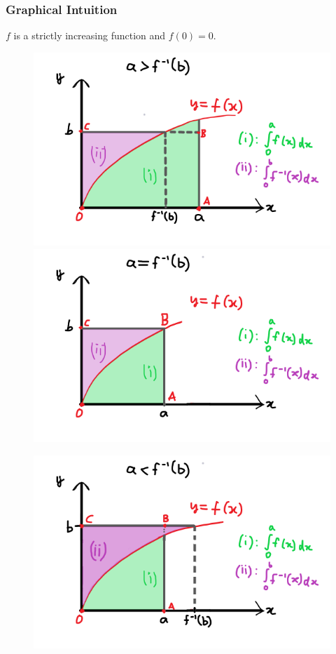 \documentclass[14]{article}
\theoremstyle{definition}
\theoremstyle{case}
\begin{document}
\subsubsection{Graphical Intuition}
$f$ is a strictly increasing function and $f(0) = 0$.
\begin{figure}[h]
\includegraphics[scale=.55]{images/youngs_inequality_1}
\includegraphics[scale=.55]{images/youngs_inequality_2}
\end{figure}
\begin{figure}[h]
\includegraphics[scale=.55]{images/youngs_inequality_3}
\end{figure}\\
\end{document}
